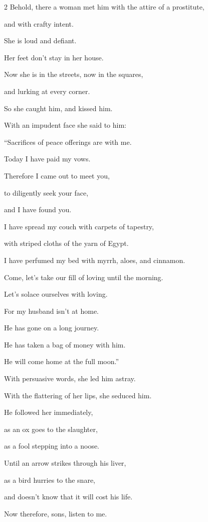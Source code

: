 \begin{multicols}{2}
\myverse{}Behold, there a woman met him with the attire of a prostitute,

and with crafty intent.


\myverse{}She is loud and defiant.

Her feet don’t stay in her house.


\myverse{}Now she is in the streets, now in the squares,

and lurking at every corner.


\myverse{}So she caught him, and kissed him.

With an impudent face she said to him:


\myverse{}“Sacrifices of peace offerings are with me.

Today I have paid my vows.


\myverse{}Therefore I came out to meet you,

to diligently seek your face,

and I have found you.


\myverse{}I have spread my couch with carpets of tapestry,

with striped cloths of the yarn of Egypt.


\myverse{}I have perfumed my bed with myrrh, aloes, and cinnamon.


\myverse{}Come, let’s take our fill of loving until the morning.

Let’s solace ourselves with loving.


\myverse{}For my husband isn’t at home.

He has gone on a long journey.


\myverse{}He has taken a bag of money with him.

He will come home at the full moon.”


\myverse{}With persuasive words, she led him astray.

With the flattering of her lips, she seduced him.


\myverse{}He followed her immediately,

as an ox goes to the slaughter,

as a fool stepping into a noose.


\myverse{}Until an arrow strikes through his liver,

as a bird hurries to the snare,

and doesn’t know that it will cost his life.


\vspace{\baselineskip} 
\myverse{}Now therefore, sons, listen to me.


\end{multicols}

